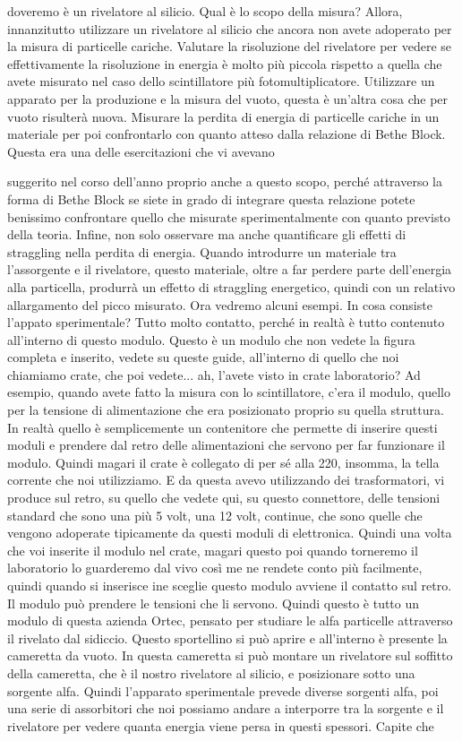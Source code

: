 {doveremo è un rivelatore al silicio. Qual è lo scopo della misura? Allora, innanzitutto utilizzare un rivelatore al silicio che ancora non avete adoperato per la misura di particelle cariche. Valutare la risoluzione del rivelatore per vedere se effettivamente la risoluzione in energia è molto più piccola rispetto a quella che avete misurato nel caso dello scintillatore più fotomultiplicatore. Utilizzare un apparato per la produzione e la misura del vuoto, questa è un'altra cosa che per vuoto risulterà nuova. Misurare la perdita di energia di particelle cariche in un materiale per poi confrontarlo con quanto atteso dalla relazione di Bethe Block. Questa era una delle esercitazioni che vi avevano 

suggerito nel corso dell'anno proprio anche a questo scopo, perché attraverso la forma di Bethe Block se siete in grado di integrare questa relazione potete benissimo confrontare quello che misurate sperimentalmente con quanto previsto della teoria. Infine, non solo osservare ma anche quantificare gli effetti di straggling nella perdita di energia. Quando introdurre un materiale tra l'assorgente e il rivelatore, questo materiale, oltre a far perdere parte dell'energia alla particella, produrrà un effetto di straggling energetico, quindi con un relativo allargamento del picco misurato. Ora vedremo alcuni esempi. In cosa consiste l'appato sperimentale? Tutto molto contatto, perché in realtà è tutto contenuto all'interno di questo modulo. Questo è un modulo che non vedete la figura completa e inserito, vedete su queste guide, all'interno di quello che noi chiamiamo crate, che poi vedete... ah, l'avete visto in crate laboratorio? Ad esempio, quando avete fatto la misura con lo scintillatore, c'era il modulo, quello per la tensione di alimentazione che era posizionato proprio su quella struttura. In realtà quello è semplicemente un contenitore che permette di inserire questi moduli e prendere dal retro delle alimentazioni che servono per far funzionare il modulo. Quindi magari il crate è collegato di per sé alla 220, insomma, la tella corrente che noi utilizziamo. E da questa avevo utilizzando dei trasformatori, vi produce sul retro, su quello che vedete qui, su questo connettore, delle tensioni standard che sono una più 5 volt, una 12 volt, continue, che sono quelle che vengono adoperate tipicamente da questi moduli di elettronica. Quindi una volta che voi inserite il modulo nel crate, magari questo poi quando torneremo il laboratorio lo guarderemo dal vivo così me ne rendete conto più facilmente, quindi quando si inserisce ine sceglie questo modulo avviene il contatto sul retro. Il modulo può prendere le tensioni che li servono. Quindi questo è tutto un modulo di questa azienda Ortec, pensato per studiare le alfa particelle attraverso il rivelato dal sidiccio. Questo sportellino si può aprire e all'interno è presente la cameretta da vuoto. In questa cameretta si può montare un rivelatore sul soffitto della cameretta, che è il nostro rivelatore al silicio, e posizionare sotto una sorgente alfa. Quindi l'apparato sperimentale prevede diverse sorgenti alfa, poi una serie di assorbitori che noi possiamo andare a interporre tra la sorgente e il rivelatore per vedere quanta energia viene persa in questi spessori. Capite che }
